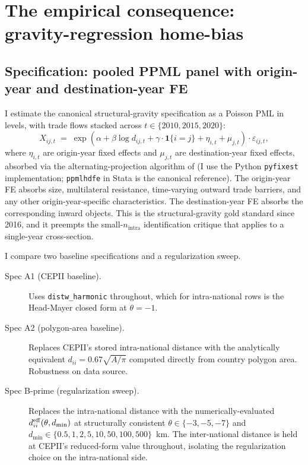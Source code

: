 
\section{The empirical consequence: gravity-regression home-bias}
\label{sec:empirical}

\subsection{Specification: pooled PPML panel with origin-year and destination-year FE}

I estimate the canonical \citet{yotov_piermartini_monteiro_larch_2016}
structural-gravity specification as a Poisson PML in levels, with
trade flows stacked across $t \in \{2010, 2015, 2020\}$:
\begin{equation}
\label{eq:panel-ppml}
X_{ij,t} \;=\; \exp\left(\alpha + \beta \log d_{ij,t} + \gamma \cdot \mathbf{1}\{i = j\} + \eta_{i,t} + \mu_{j,t}\right) \cdot \varepsilon_{ij,t},
\end{equation}
where $\eta_{i,t}$ are origin-year fixed effects and $\mu_{j,t}$ are
destination-year fixed effects, absorbed via the
alternating-projection algorithm of \citet{correia_guimaraes_zylkin_2020}
(I use the Python \texttt{pyfixest} implementation; \texttt{ppmlhdfe}
in Stata is the canonical reference). The origin-year FE absorbs
size, multilateral resistance, time-varying outward trade barriers,
and any other origin-year-specific characteristics. The
destination-year FE absorbs the corresponding inward objects. This is
the structural-gravity gold standard since 2016, and it preempts the
small-$n_{\text{intra}}$ identification critique that applies to a
single-year cross-section.

I compare two baseline specifications and a regularization sweep.

\begin{description}
\item[Spec A1 (CEPII baseline).] Uses \texttt{distw\_harmonic}
  throughout, which for intra-national rows is the Head-Mayer closed
  form at $\theta = -1$.
\item[Spec A2 (polygon-area baseline).] Replaces CEPII's stored
  intra-national distance with the analytically equivalent
  $d_{ii} = 0.67\sqrt{A/\pi}$ computed directly from country polygon
  area. Robustness on data source.
\item[Spec B-prime (regularization sweep).] Replaces the
  intra-national distance with the numerically-evaluated
  $d_{ii}^{\rm eff}(\theta, d_{\min})$ at structurally consistent
  $\theta \in \{-3, -5, -7\}$ and
  $d_{\min} \in \{0.5, 1, 2, 5, 10, 50, 100, 500\}$~km. The
  inter-national distance is held at CEPII's reduced-form value
  throughout, isolating the regularization choice on the
  intra-national side.
\end{description}

